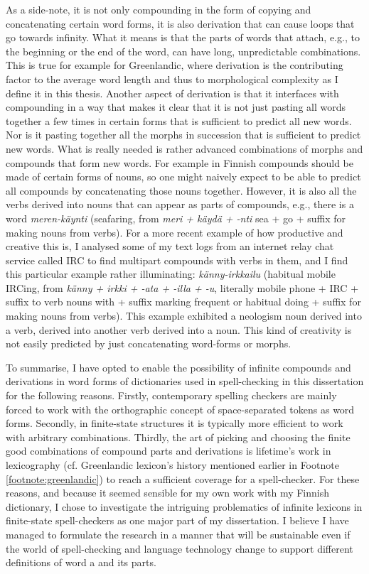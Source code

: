 \documentclass[officiallayout,final]{unihelcompling}
\begin{document}
As a side-note, it is not only compounding in the form of copying and
concatenating certain word forms, it is also derivation that can cause loops
that go towards infinity. What it means is that the parts of words that attach,
e.g., to the beginning or the end of the word, can have long, unpredictable
combinations. This is true for example for Greenlandic, where derivation is the
contributing factor to the average word length and thus to \gls{morphological
complexity} as I define it in this thesis.  Another aspect of derivation is
that it interfaces with compounding in a way that makes it clear that it is not
just pasting all words together a few times in certain forms that is sufficient
to predict all new words. Nor is it pasting together all the morphs in
succession that is sufficient to predict new words. What is really needed is
rather advanced combinations of morphs and compounds that form new words. For
example in Finnish compounds should be made of certain forms of nouns, so one
might naively expect to be able to predict all compounds by concatenating those
nouns together. However, it is also all the verbs derived into nouns that can
appear as parts of compounds, e.g., there is a word \emph{meren-käynti}
(seafaring, from \emph{meri + käydä + -nti} sea + go + suffix for making nouns
from verbs).  For a more recent example of how productive and creative this is,
I analysed some of my text logs from an internet relay chat service called IRC
to find multipart compounds with verbs in them, and I find this particular
example rather illuminating: \emph{känny-irkkailu} (habitual mobile IRCing,
from \emph{känny + irkki + -ata + -illa + -u}, literally mobile phone + IRC +
suffix to verb nouns with + suffix marking frequent or habitual doing + suffix
for making nouns from verbs). This example exhibited a neologism noun derived
into a verb, derived into another verb derived into a noun.  This kind of
creativity is not easily predicted by just concatenating word-forms or morphs.

To summarise, I have opted to enable the possibility of infinite compounds and
derivations in word forms of dictionaries used in spell-checking in this
dissertation for the following reasons. Firstly, contemporary spelling checkers
are mainly forced to work with the orthographic concept of space-separated
tokens as word forms. Secondly, in finite-state structures it is typically more
efficient to work with arbitrary combinations.  Thirdly, the art of picking and
choosing the finite good combinations of compound parts and derivations is
lifetime's work in lexicography (cf.  Greenlandic lexicon's history mentioned
earlier in Footnote \ref{footnote:greenlandic}) to reach a sufficient coverage
for a spell-checker.  For these reasons, and because it seemed sensible for my
own work with my Finnish dictionary, I chose to investigate the intriguing
problematics of infinite lexicons in finite-state spell-checkers as one major
part of my dissertation. I believe I have managed to formulate the research in
a manner that will be sustainable even if the world of spell-checking and
language technology change to support different definitions of word a and its
parts.
\end{document}
